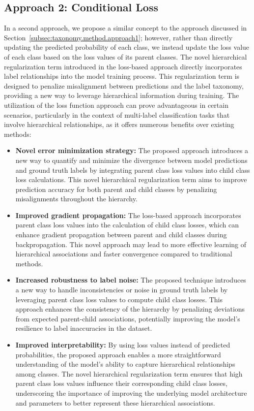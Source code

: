 \documentclass[review,1p,times,numbers]{elsarticle}
\begin{document}
\subsection{Approach 2: Conditional Loss}\label{subsec:taxonomy.method.approach2}
In a second approach, we propose a similar concept to the approach discussed in Section~\ref{subsec:taxonomy.method.approach1}; however, rather than directly updating the predicted probability of each class, we instead update the loss value of each class based on the loss values of its parent classes. The novel hierarchical regularization term introduced in the loss-based approach directly incorporates label relationships into the model training process. This regularization term is designed to penalize misalignment between predictions and the label taxonomy, providing a new way to leverage hierarchical information during training. The utilization of the loss function approach can prove advantageous in certain scenarios, particularly in the context of multi-label classification tasks that involve hierarchical relationships, as it offers numerous benefits over existing methods:
\begin{itemize}
\item \textbf{Novel error minimization strategy:} The proposed approach introduces a new way to quantify and minimize the divergence between model predictions and ground truth labels by integrating parent class loss values into child class loss calculations. This novel hierarchical regularization term aims to improve prediction accuracy for both parent and child classes by penalizing misalignments throughout the hierarchy.
\item \textbf{Improved gradient propagation:} The loss-based approach incorporates parent class loss values into the calculation of child class losses, which can enhance gradient propagation between parent and child classes during backpropagation. This novel approach may lead to more effective learning of hierarchical associations and faster convergence compared to traditional methods.
\item \textbf{Increased robustness to label noise:} The proposed technique introduces a new way to handle inconsistencies or noise in ground truth labels by leveraging parent class loss values to compute child class losses. This approach enhances the consistency of the hierarchy by penalizing deviations from expected parent-child associations, potentially improving the model's resilience to label inaccuracies in the dataset.
\item \textbf{Improved interpretability:} By using loss values instead of predicted probabilities, the proposed approach enables a more straightforward understanding of the model's ability to capture hierarchical relationships among classes. The novel hierarchical regularization term ensures that high parent class loss values influence their corresponding child class losses, underscoring the importance of improving the underlying model architecture and parameters to better represent these hierarchical associations.
\end{itemize}
\end{document}
